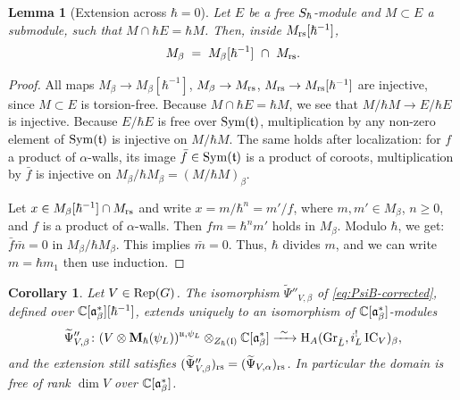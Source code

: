 \documentclass{article}
\theoremstyle{plain}
\newtheorem{lemma}[theorem]{Lemma}
\newtheorem{corollary}[theorem]{Corollary}
\theoremstyle{definition}
\theoremstyle{remark}
\numberwithin{equation}{section}
\begin{document}
\begin{lemma}[Extension across $\hbar=0$]\label{lem:extension}
Let $E$ be a free $S_\hbar$-module and $M\subset E$ a submodule, such that $M\cap\hbar E=\hbar M$. Then, inside $M_{\mathrm{rs}}[\hbar^{-1}]$,
\[
M_\beta\;=\;M_\beta[\hbar^{-1}]\ \cap\ M_{\mathrm{rs}} .
\]
\end{lemma}

\begin{proof}
All maps $M_\beta\to M_\beta[\hbar^{-1}]$, $M_\beta\to M_{\mathrm{rs}}$, $M_{\mathrm{rs}}\to M_{\mathrm{rs}}[\hbar^{-1}]$ are injective, since $M\subset E$ is torsion-free. Because $M\cap\hbar E=\hbar M$, we see that $M/\hbar M\to E/\hbar E$ is injective. Because $E/\hbar E$ is free over $\operatorname{Sym}(\mathfrak{t})$, multiplication by any non-zero element of $\operatorname{Sym}(\mathfrak{t})$ is injective on $M/\hbar M$. The same holds after localization: for $f$ a product of $\alpha$-walls, its image $\bar f\in\operatorname{Sym}(\mathfrak{t})$ is a product of coroots, multiplication by $\bar f$ is injective on $M_\beta/\hbar M_\beta=(M/\hbar M)_\beta$.

Let $x\in M_\beta[\hbar^{-1}]\cap M_{\mathrm{rs}}$ and write $x=m/\hbar^n=m'/f$, where $m,m'\in M_\beta$, $n\ge0$, and $f$ is a product of $\alpha$-walls. Then $fm=\hbar^nm'$ holds in $M_\beta$. Modulo $\hbar$, we get: $\bar f\bar m=0$ in $M_\beta/\hbar M_\beta$. This implies $\bar m=0$.
Thus, $\hbar$ divides $m$, and we can write $m =\hbar m_1$ then use induction.
\end{proof}

\begin{corollary}\label{cor:extension}
Let $V\in\operatorname{Rep}(G)$. The isomorphism $\widetilde\Psi''_{V,\beta}$ of \eqref{eq:PsiB-corrected}, defined over $\mathbb{C}[\mathfrak{a}^*_{\beta}][\hbar^{-1}]$, extends uniquely to an isomorphism of $\mathbb{C}[\mathfrak{a}^*_{\beta}]$-modules
\[
\widetilde\Psi''_{V,\beta}\colon(V\otimes\bM_\hbar(\psiL))^{\fraku,\psiL}\otimes_{\Zh(\frakl)}\Cbe\xrightarrow{\ \sim\ }\H_A(\GrL,i_L^!\IC_V)_\beta ,
\]
and the extension still satisfies $(\widetilde\Psi''_{V,\beta})_{\mathrm{rs}}=(\widetilde\Psi_{V,\alpha})_{\mathrm{rs}}$. In particular the domain is free of rank $\dim V$ over $\mathbb{C}[\mathfrak{a}^*_{\beta}]$.
\end{corollary}
\end{document}
